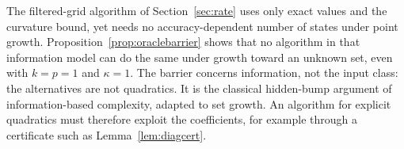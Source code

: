 The filtered-grid algorithm of Section~\ref{sec:rate} uses only exact values
and the curvature bound, yet needs no accuracy-dependent number of states under
point growth. Proposition~\ref{prop:oraclebarrier} shows that no algorithm in
that information model can do the same under growth toward an unknown set,
even with $k=p=1$ and $\kappa=1$. The barrier concerns information, not the
input class: the alternatives are not quadratics. It is the classical
hidden-bump argument of information-based complexity, adapted to set growth.
An algorithm for explicit quadratics must therefore exploit the coefficients,
for example through a certificate such as Lemma~\ref{lem:diagcert}.

